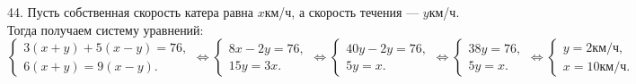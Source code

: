 44. Пусть собственная скорость катера равна $x$км/ч, а скорость течения --- $y$км/ч. Тогда получаем систему уравнений: $\begin{cases}3(x+y)+5(x-y)=76,\\
6(x+y)=9(x-y).\end{cases}\Leftrightarrow\begin{cases}8x-2y=76,\\
15y=3x.\end{cases}\Leftrightarrow\begin{cases}40y-2y=76,\\
5y=x.\end{cases}\Leftrightarrow\begin{cases}38y=76,\\
5y=x.\end{cases}\Leftrightarrow\begin{cases} y=2\text{км/ч},\\
x=10\text{км/ч}.\end{cases}$\\
